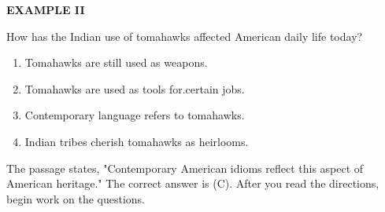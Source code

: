 \documentclass[12pt]{article}
\begin{document}
\begin{exampleblock}
\textbf{EXAMPLE II}\par
\noindent How has the Indian use of tomahawks affected American daily life today?
\begin{enumerate}[label=(\Alph*),leftmargin=*,itemsep=0.2em]
\item Tomahawks are still used as weapons.
\item Tomahawks are used as tools for.certain jobs.
\item Contemporary language refers to tomahawks.
\item Indian tribes cherish tomahawks as heirlooms.
\end{enumerate}
\vspace{0.25\baselineskip}
The passage states, "Contemporary American idioms reflect this aspect of American heritage." The correct answer is (C). After you read the directions, begin work on the questions.\par
\end{exampleblock}
\end{document}

